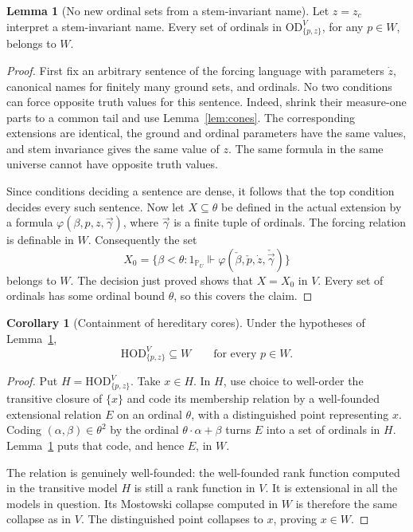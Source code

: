 \documentclass[11pt,letterpaper]{article}
\theoremstyle{definition}
\newtheorem{lemma}[definition]{Lemma}
\newtheorem{corollary}[definition]{Corollary}
\numberwithin{equation}{section}
\newcommand{\HOD}{\mathrm{HOD}}
\newcommand{\OD}{\mathrm{OD}}
\newcommand{\PP}{\mathbb P}
\begin{document}
\begin{lemma}[No new ordinal sets from a stem-invariant name]\label{lem:ordinalhom}
Let $z=z_c$ interpret a stem-invariant name. Every set of ordinals in $\OD_{\{p,z\}}^V$, for any $p\in W$, belongs to $W$.
\end{lemma}
\begin{proof}
First fix an arbitrary sentence of the forcing language with parameters $\dot z$, canonical names for finitely many ground sets, and ordinals. No two conditions can force opposite truth values for this sentence. Indeed, shrink their measure-one parts to a common tail and use Lemma~\ref{lem:cones}. The corresponding extensions are identical, the ground and ordinal parameters have the same values, and stem invariance gives the same value of $z$. The same formula in the same universe cannot have opposite truth values.

Since conditions deciding a sentence are dense, it follows that the top condition decides every such sentence. Now let $X\subseteq\theta$ be defined in the actual extension by a formula $\varphi(\beta,p,z,\vec\gamma)$, where $\vec\gamma$ is a finite tuple of ordinals. The forcing relation is definable in $W$. Consequently the set
\[
X_0=\{\beta<\theta:1_{\PP_U}\Vdash
       \varphi(\check\beta,\check p,\dot z,\check{\vec\gamma})\}
\]
belongs to $W$. The decision just proved shows that $X=X_0$ in $V$. Every set of ordinals has some ordinal bound $\theta$, so this covers the claim.
\end{proof}

\begin{corollary}[Containment of hereditary cores]\label{cor:hodground}
Under the hypotheses of Lemma~\ref{lem:ordinalhom},
\[
\HOD_{\{p,z\}}^V\subseteq W
\qquad\text{for every }p\in W.
\]
\end{corollary}
\begin{proof}
Put $H=\HOD_{\{p,z\}}^V$. Take $x\in H$. In $H$, use choice to well-order the transitive closure of $\{x\}$ and code its membership relation by a well-founded extensional relation $E$ on an ordinal $\theta$, with a distinguished point representing $x$. Coding $(\alpha,\beta)\in\theta^2$ by the ordinal $\theta\cdot\alpha+\beta$ turns $E$ into a set of ordinals in $H$. Lemma~\ref{lem:ordinalhom} puts that code, and hence $E$, in $W$.

The relation is genuinely well-founded: the well-founded rank function computed in the transitive model $H$ is still a rank function in $V$. It is extensional in all the models in question. Its Mostowski collapse computed in $W$ is therefore the same collapse as in $V$. The distinguished point collapses to $x$, proving $x\in W$.
\end{proof}
\end{document}
